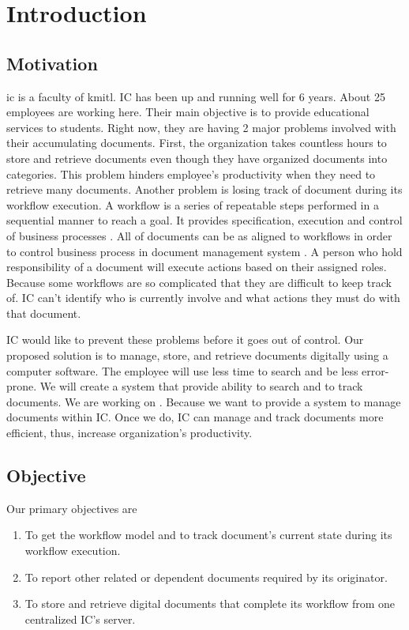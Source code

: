 \chapter{Introduction}

\section{Motivation}
\gls{ic} is a faculty of \gls{kmitl}. 
IC has been up and running well for 6 years.
About 25 employees are working here. %
Their main objective is to provide educational services to students. 
Right now, they are having 2 major problems involved with their accumulating documents.
First, the organization takes countless hours to store and retrieve documents even though they have organized documents into categories. 
This problem hinders employee's productivity when they need to retrieve many documents. 
Another problem is losing track of document during its workflow execution. 
A workflow is a series of repeatable steps performed in a sequential manner to reach a goal.
It provides specification, execution and control of business processes \cite{Jablonski:1996:WMM}. 
All of documents can be as aligned to workflows in order to control business process in document management system \cite{DBLP:journals/corr/AsiliT14}.
A person who hold responsibility of a document will execute actions based on their assigned roles.
Because some workflows are so complicated that they are difficult to keep track of.
IC can't identify who is currently involve and what actions they must do with that document.

IC would like to prevent these problems before it goes out of control. 
Our proposed solution is to manage, store, and retrieve documents digitally using a computer software.
The employee will use less time to search and be less error-prone.
We will create a system that provide ability to search and to track documents.
We are working on \dms.
Because we want to provide a system to manage documents within IC.
Once we do, IC can manage and track documents more efficient, thus, increase organization's productivity.

\section{Objective}
Our primary objectives are
\begin{enumerate}
\item To get the workflow model and to track document's current state during its workflow execution. 
\item To report other related or dependent documents required by its originator.
\item To store and retrieve digital documents that complete its workflow from one centralized IC's server.
\end{enumerate}

